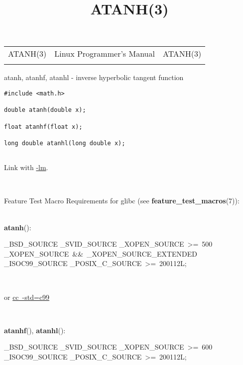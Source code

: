 \documentclass[]{article}
\title{ATANH(3)}
\author{}
\date{}
\let\realtextbf=\textbf
\renewcommand{\textbf}[1]{\textcolor{boldcolor}{\realtextbf{#1}}}
\renewcommand{\emph}[1]{\underline{#1}}
\begin{document}
\maketitle

\begin{longtable}[c]{@{}lll@{}}
\toprule\addlinespace
ATANH(3) & Linux Programmer's Manual & ATANH(3)
\\\addlinespace
\bottomrule
\end{longtable}


atanh, atanhf, atanhl - inverse hyperbolic tangent function


\begin{verbatim}
#include <math.h>
 
double atanh(double x);
 
float atanhf(float x);
 
long double atanhl(long double x);
 
\end{verbatim}

Link with \emph{-lm}.

~

Feature Test Macro Requirements for glibc (see
\textbf{feature\_test\_macros}(7)): \\

~

\textbf{atanh}():

\_BSD\_SOURCE \textbar{}\textbar{} \_SVID\_SOURCE \textbar{}\textbar{}
\_XOPEN\_SOURCE~\textgreater{}=~500 \textbar{}\textbar{}
\_XOPEN\_SOURCE~\&\&~\_XOPEN\_SOURCE\_EXTENDED \textbar{}\textbar{}
\_ISOC99\_SOURCE \textbar{}\textbar{}
\_POSIX\_C\_SOURCE~\textgreater{}=~200112L;

~

or \emph{cc~-std=c99}

~

\textbf{atanhf}(), \textbf{atanhl}():

\_BSD\_SOURCE \textbar{}\textbar{} \_SVID\_SOURCE \textbar{}\textbar{}
\_XOPEN\_SOURCE~\textgreater{}=~600 \textbar{}\textbar{}
\_ISOC99\_SOURCE \textbar{}\textbar{}
\_POSIX\_C\_SOURCE~\textgreater{}=~200112L;

~
\end{document}
